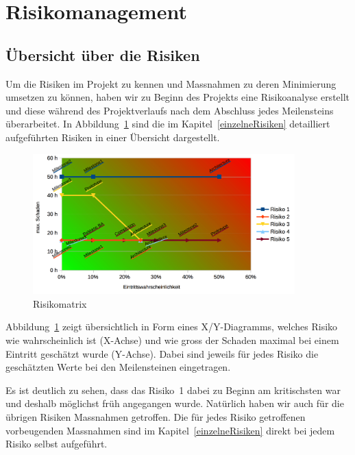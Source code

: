 \chapter*{Risikomanagement}
	
	\label{risiken}
	
	\section*{Übersicht über die Risiken}
		Um die Risiken im Projekt zu kennen und Massnahmen zu deren Minimierung umsetzen zu können, haben wir zu Beginn des Projekts eine Risikoanalyse erstellt und diese während des Projektverlaufs nach dem Abschluss jedes Meilensteins überarbeitet.
		In Abbildung~\ref{fig:RiskMatrix} sind die im Kapitel~\ref{einzelneRisiken} detailliert aufgeführten Risiken in einer Übersicht dargestellt.
		
		\begin{figure}[H]
			\includegraphics[width=0.9\textwidth]{projectPlan/media/img/risikomatrix.png}
			\centering
			\caption{Risikomatrix}
			\label{fig:RiskMatrix}
		\end{figure}
	
		Abbildung~\ref{fig:RiskMatrix} zeigt übersichtlich in Form eines X/Y-Diagramms, welches Risiko wie wahrscheinlich ist (X-Achse) und wie gross der Schaden maximal bei einem Eintritt geschätzt wurde (Y-Achse).
		Dabei sind jeweils für jedes Risiko die geschätzten Werte bei den Meilensteinen eingetragen.
		
		Es ist deutlich zu sehen, dass das Risiko~1 dabei zu Beginn am kritischsten war und deshalb möglichst früh angegangen wurde.
		Natürlich haben wir auch für die übrigen Risiken Massnahmen getroffen.
		Die für jedes Risiko getroffenen vorbeugenden Massnahmen sind im Kapitel~\ref{einzelneRisiken} direkt bei jedem Risiko selbst aufgeführt.
	

